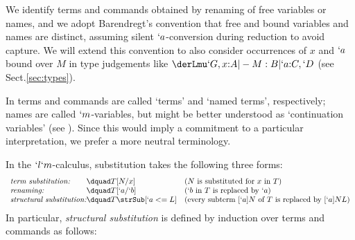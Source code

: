 \documentclass{CSML}
\newcommand{\Comment}[1]{}
\begin{document}
We identify terms and commands obtained by renaming of free variables or names, and we adopt Barendregt's convention that free and bound variables and names are distinct, assuming silent $`a$-conversion during reduction to avoid capture.
We will extend this convention to also consider occurrences of $x$ and $`a$ bound over $M$ in type judgements like $\derLmu `G,x{:}A |- M : B | `a{:}C,`D $ (see Sect.\skp\ref{sec:types}).

\Comment{%
Note that we could have defined the set of \emph{pure $`l`m$-terms} via the grammar:
%
%
 \[ \begin{array}{rcl}
M,N & :: =& x \mid `lx.M \mid MN \mid `m`a.[`b]M
 \end{array} \]
but it is convenient to have commands as part of the syntax as well.
}%

In \cite{Parigot'92} terms and commands are called `terms' and `named terms', respectively; names are called $`m$-variables, but might be better understood as `continuation variables' (see \cite{Streicher-Reus'98}).
Since this would imply a %
commitment to a particular interpretation, we prefer a more neutral terminology.

In the $`l`m$-calculus, substitution takes the following three forms:
%
%
 \[ \begin{array}{l@{\dquad}ll}
 \textit{term substitution:} & T[N/x] & (\textrm{$N$ is substituted for $x$ in $T$}) \\
 \textit{renaming:} & T[`a/`b] & (\textrm{$`b$ in $T$ is replaced by $`a$}) \\
 \textit{structural substitution:} & T \strSub[`a<=L] & (\textrm{every subterm $[`a]N$ of $T$ is replaced by $[`a]NL$})
 \end{array} \]
In particular, \emph{structural substitution} is defined by induction over terms and commands as follows:
\end{document}
